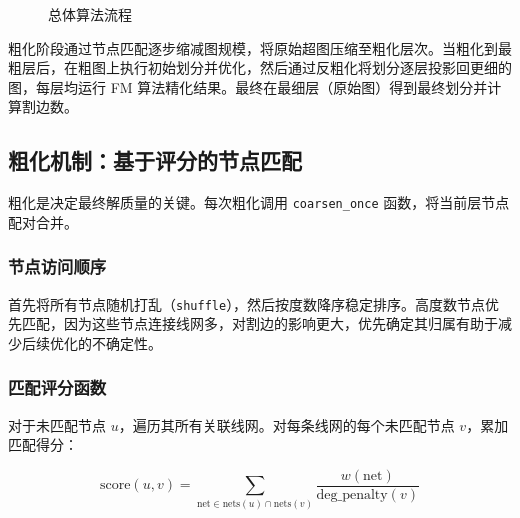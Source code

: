\documentclass[journal, twocolumn]{IEEEtran}
\begin{document}
\begin{figure}[htbp]
\centering
{}
\caption{总体算法流程}
\label{fig:flow}
\end{figure}

粗化阶段通过节点匹配逐步缩减图规模，将原始超图压缩至粗化层次。当粗化到最粗层后，在粗图上执行初始划分并优化，然后通过反粗化将划分逐层投影回更细的图，每层均运行 FM 算法精化结果。最终在最细层（原始图）得到最终划分并计算割边数。

\subsection{粗化机制：基于评分的节点匹配}

粗化是决定最终解质量的关键。每次粗化调用 \texttt{coarsen\_once} 函数，将当前层节点配对合并。

\subsubsection{节点访问顺序}

首先将所有节点随机打乱（\texttt{shuffle}），然后按度数降序稳定排序。高度数节点优先匹配，因为这些节点连接线网多，对割边的影响更大，优先确定其归属有助于减少后续优化的不确定性。

\subsubsection{匹配评分函数}

对于未匹配节点 $u$，遍历其所有关联线网。对每条线网的每个未匹配节点 $v$，累加匹配得分：

\begin{equation}
\text{score}(u, v) = \sum_{\text{net} \in \text{nets}(u) \cap \text{nets}(v)} \frac{w(\text{net})}{\text{deg\_penalty}(v)}
\end{equation}
\end{document}
